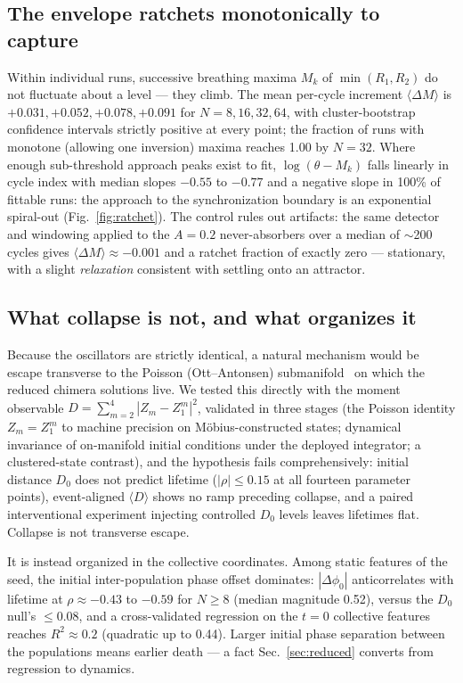 \documentclass[pdflatex,sn-mathphys,Numbered]{sn-jnl}
\begin{document}
\subsection{The envelope ratchets monotonically to capture}

Within individual runs, successive breathing maxima $M_k$ of $\min(R_1, R_2)$ do not
fluctuate about a level --- they climb. The mean per-cycle increment
$\langle \Delta M \rangle$ is $+0.031, +0.052, +0.078, +0.091$ for
$N = 8, 16, 32, 64$, with cluster-bootstrap confidence intervals strictly positive
at every point; the fraction of runs with monotone (allowing one inversion) maxima
reaches 1.00 by $N = 32$. Where enough sub-threshold approach peaks exist to fit,
$\log(\theta - M_k)$ falls linearly in cycle index with median slopes $-0.55$ to
$-0.77$ and a negative slope in 100\% of fittable runs: the approach to the
synchronization boundary is an exponential spiral-out (Fig.~\ref{fig:ratchet}). The
control rules out artifacts: the same detector and windowing applied to the
$A = 0.2$ never-absorbers over a median of $\sim$200 cycles gives
$\langle \Delta M \rangle \approx -0.001$ and a ratchet fraction of exactly zero ---
stationary, with a slight \emph{relaxation} consistent with settling onto an
attractor.

\subsection{What collapse is not, and what organizes it}

Because the oscillators are strictly identical, a natural mechanism would be escape
transverse to the Poisson (Ott--Antonsen) submanifold~\cite{ott2008,ott2009} on
which the reduced chimera solutions live. We tested this directly with the moment observable
$D = \sum_{m=2}^{4} |Z_m - Z_1^m|^2$, validated in three stages (the Poisson
identity $Z_m = Z_1^m$ to machine precision on M\"obius-constructed states;
dynamical invariance of on-manifold initial conditions under the deployed integrator;
a clustered-state contrast), and the hypothesis fails comprehensively: initial
distance $D_0$ does not predict lifetime ($|\rho| \le 0.15$ at all fourteen
parameter points), event-aligned $\langle D \rangle$ shows no ramp preceding
collapse, and a paired interventional experiment injecting controlled $D_0$ levels
leaves lifetimes flat. Collapse is not transverse escape.

It is instead organized in the collective coordinates. Among static features of the
seed, the initial inter-population phase offset dominates: $|\Delta\phi_0|$
anticorrelates with lifetime at $\rho \approx -0.43$ to $-0.59$ for $N \ge 8$
(median magnitude 0.52), versus the $D_0$ null's $\le 0.08$, and a cross-validated
regression on the $t = 0$ collective features reaches $R^2 \approx 0.2$
(quadratic up to 0.44). Larger initial phase separation between the populations
means earlier death --- a fact Sec.~\ref{sec:reduced} converts from regression to
dynamics.
\end{document}
